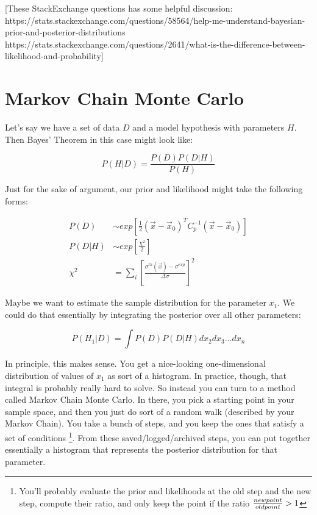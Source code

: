 [These StackExchange questions has some helpful discussion: \\ https://stats.stackexchange.com/questions/58564/help-me-understand-bayesian-prior-and-posterior-distributions \\
https://stats.stackexchange.com/questions/2641/what-is-the-difference-between-likelihood-and-probability]

\section{Markov Chain Monte Carlo}

Let's say we have a set of data $D$ and a model hypothesis with parameters $H$. Then Bayes' Theorem in this case might look like:

\begin{equation}
P(H|D) = \frac{P(D)P(D|H)}{P(H)}
\end{equation}

Just for the sake of argument, our prior and likelihood might take the following forms:

\begin{align}
P(D) &\sim exp[\frac{1}{2}(\vec{x}-\vec{x}_0)^TC_p^{-1}(\vec{x}-\vec{x}_0)] \nonumber\\
P(D|H) &\sim exp[\frac{\chi^2}{2}] \nonumber\\
\chi^2 &= \sum_i\left[\frac{\sigma^{th}(\vec{x})-\sigma^{exp}}{\Delta\sigma}\right]^2 \nonumber
\end{align}

\noindent Maybe we want to estimate the sample distribution for the parameter $x_1$. We could do that essentially by integrating the posterior over all other parameters:

\begin{equation}
P(H_1|D) = \int P(D)P(D|H)dx_2dx_3\dots dx_n
\end{equation}

In principle, this makes sense. You get a nice-looking one-dimensional distribution of values of $x_1$ as sort of a histogram. In practice, though, that integral is probably really hard to solve. So instead you can turn to a method called Markov Chain Monte Carlo. In there, you pick a starting point in your sample space, and then you just do sort of a random walk (described by your Markov Chain). You take a bunch of steps, and you keep the ones that satisfy a set of conditions \footnote{You'll probably evaluate the prior and likelihoods at the old step and the new step, compute their ratio, and only keep the point if the ratio $\frac{\mathnormal{new point}}{\mathnormal{old point}}>1$}. From these saved/logged/archived steps, you can put together essentially a histogram that represents the posterior distribution for that parameter.

